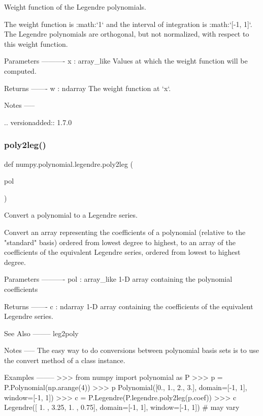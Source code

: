 \begin{DoxyVerb}Weight function of the Legendre polynomials.

The weight function is :math:`1` and the interval of integration is
:math:`[-1, 1]`. The Legendre polynomials are orthogonal, but not
normalized, with respect to this weight function.

Parameters
----------
x : array_like
   Values at which the weight function will be computed.

Returns
-------
w : ndarray
   The weight function at `x`.

Notes
-----

.. versionadded:: 1.7.0\end{DoxyVerb}
 \mbox{\label{namespacenumpy_1_1polynomial_1_1legendre_a64b1806cfd4b9d30acd2e1d549eda549}} 
\subsubsection{\texorpdfstring{poly2leg()}{poly2leg()}}
{\footnotesize\ttfamily def numpy.\+polynomial.\+legendre.\+poly2leg (\begin{DoxyParamCaption}\item[{}]{pol }\end{DoxyParamCaption})}

\begin{DoxyVerb}Convert a polynomial to a Legendre series.

Convert an array representing the coefficients of a polynomial (relative
to the "standard" basis) ordered from lowest degree to highest, to an
array of the coefficients of the equivalent Legendre series, ordered
from lowest to highest degree.

Parameters
----------
pol : array_like
    1-D array containing the polynomial coefficients

Returns
-------
c : ndarray
    1-D array containing the coefficients of the equivalent Legendre
    series.

See Also
--------
leg2poly

Notes
-----
The easy way to do conversions between polynomial basis sets
is to use the convert method of a class instance.

Examples
--------
>>> from numpy import polynomial as P
>>> p = P.Polynomial(np.arange(4))
>>> p
Polynomial([0.,  1.,  2.,  3.], domain=[-1,  1], window=[-1,  1])
>>> c = P.Legendre(P.legendre.poly2leg(p.coef))
>>> c
Legendre([ 1.  ,  3.25,  1.  ,  0.75], domain=[-1,  1], window=[-1,  1]) # may vary\end{DoxyVerb}
 

